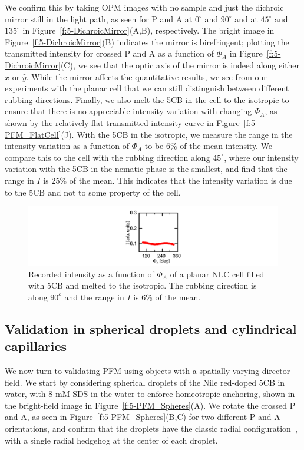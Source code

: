 We confirm this by taking OPM images with no sample and just the dichroic mirror still in the light path, as seen for P and A at $0^{\circ}$ and $90^{\circ}$ and at $45^{\circ}$ and $135^{\circ}$ in Figure~\ref{f:5-DichroicMirror}(A,B), respectively.
The bright image in Figure~\ref{f:5-DichroicMirror}(B) indicates the mirror is birefringent; plotting the transmitted intensity for crossed P and A as a function of $\Phi_A$ in Figure~\ref{f:5-DichroicMirror}(C), we see that the optic axis of the mirror is indeed along either $\hat{x}$ or $\hat{y}$.
While the mirror affects the quantitative results, we see from our experiments with the planar cell that we can still distinguish between different rubbing directions.
Finally, we also melt the 5CB in the cell to the isotropic to ensure that there is no appreciable intensity variation with changing $\Phi_A$, as shown by the relatively flat transmitted intensity curve in Figure~\ref{f:5-PFM_FlatCell}(J).
With the 5CB in the isotropic, we measure the range in the intensity variation as a function of $\Phi_A$ to be 6\% of the mean intensity.
We compare this to the cell with the rubbing direction along $45^{\circ}$, where our intensity variation with the 5CB in the nematic phase is the smallest, and find that the range in $I$ is 25\% of the mean.
This indicates that the intensity variation is due to the 5CB and not to some property of the cell.
\begin{figure}
  \includegraphics{figures/C5/Ch5-Figs_IsotropicPlanar.png}
  \caption{Recorded intensity as a function of $\Phi_A$ of a planar NLC cell filled with 5CB and melted to the isotropic.
  The rubbing direction is along $90^o$ and the range in $I$ is 6\% of the mean.}\label{f:5-IsotropicPlanar}
\end{figure}


\subsection{Validation in spherical droplets and cylindrical capillaries}
We now turn to validating PFM using objects with a spatially varying director field.
We start by considering spherical droplets of the Nile red-doped 5CB in water, with 8 mM SDS in the water to enforce homeotropic anchoring, shown in the bright-field image in Figure~\ref{f:5-PFM_Spheres}(A).
We rotate the crossed P and A, as seen in Figure~\ref{f:5-PFM_Spheres}(B,C) for two different P and A orientations, and confirm that the droplets have the classic radial configuration~\cite{RN177}, with a single radial hedgehog at the center of each droplet.

